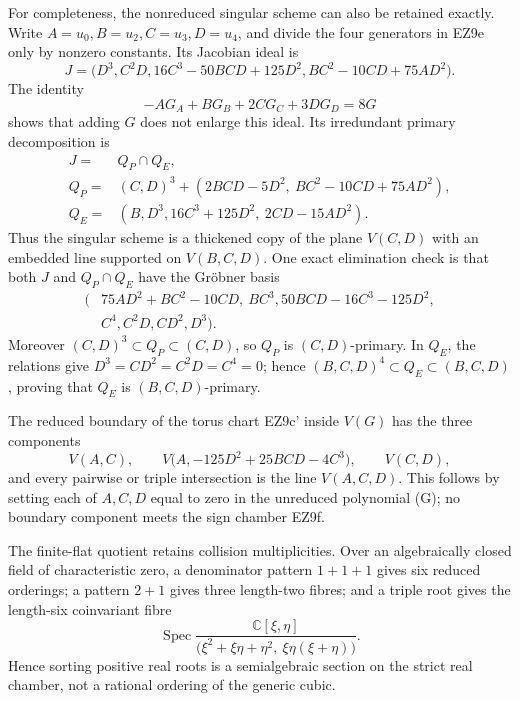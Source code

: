 \documentclass[11pt]{article}
\theoremstyle{definition}\newtheorem{definition}[theorem]{Definition}
\theoremstyle{remark}\newtheorem{remark}[theorem]{Remark}
\DeclareMathOperator{\Spec}{Spec}
\begin{document}
For completeness, the nonreduced singular scheme can also be retained
exactly.  Write \(A=u_0,B=u_2,C=u_3,D=u_4\), and divide the four generators
in EZ9e only by nonzero constants.  Its Jacobian ideal is
\begin{equation}
 J=\bigl(D^3,C^2D,16C^3-50BCD+125D^2,
                 BC^2-10CD+75AD^2\bigr).              \tag{EZ9i}
\end{equation}
The identity
\[
 -A G_A+B G_B+2C G_C+3D G_D=8G
\]
shows that adding \(G\) does not enlarge this ideal.  Its irredundant primary
decomposition is
\begin{align}
 J={}&Q_P\cap Q_E,\nonumber\\
 Q_P={}&(C,D)^3+
 (2BCD-5D^2,\ BC^2-10CD+75AD^2),\nonumber\\
 Q_E={}&(B,D^3,16C^3+125D^2,\ 2CD-15AD^2).            \tag{EZ9j}
\end{align}
Thus the singular scheme is a thickened copy of the plane \(V(C,D)\) with
an embedded line supported on \(V(B,C,D)\).  One exact elimination check is
that both \(J\) and \(Q_P\cap Q_E\) have the Gr\"obner basis
\[
 \begin{split}
 (&75AD^2+BC^2-10CD,\ BC^3,
 50BCD-16C^3-125D^2,\\
 &C^4,C^2D,CD^2,D^3).
 \end{split}
\]
Moreover \((C,D)^3\subset Q_P\subset(C,D)\), so \(Q_P\) is
\((C,D)\)-primary.  In \(Q_E\), the relations give
\(D^3=CD^2=C^2D=C^4=0\); hence
\((B,C,D)^4\subset Q_E\subset(B,C,D)\), proving that \(Q_E\) is
\((B,C,D)\)-primary.

The reduced boundary of the torus chart EZ9c' inside \(V(G)\) has the three
components
\begin{equation}
 V(A,C),\qquad
 V\bigl(A,-125D^2+25BCD-4C^3\bigr),\qquad
 V(C,D),                                                 \tag{EZ9k}
\end{equation}
and every pairwise or triple intersection is the line \(V(A,C,D)\).
This follows by setting each of \(A,C,D\) equal to zero in the unreduced
polynomial (G); no boundary component meets the sign chamber EZ9f.

The finite-flat quotient retains collision multiplicities.  Over an
algebraically closed field of characteristic zero, a denominator pattern
\(1+1+1\) gives six reduced orderings; a pattern \(2+1\) gives three
length-two fibres; and a triple root gives the length-six coinvariant fibre
\[
 \Spec\frac{\mathbb C[\xi,\eta]}
 {\bigl(\xi^2+\xi\eta+\eta^2,\ \xi\eta(\xi+\eta)\bigr)}.
\]
Hence sorting positive real roots is a semialgebraic section on the strict
real chamber, not a rational ordering of the generic cubic.
\end{document}
